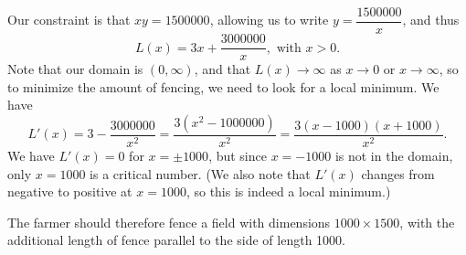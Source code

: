 \documentclass[12pt]{article}
\begin{document}
\begin{enumerate}
Our constraint is that $xy=1500000$, allowing us to write $y=\dfrac{1500000}{x}$, and thus
\[
L(x) = 3x+\frac{3000000}{x}, \text{ with } x>0.
\]
Note that our domain is $(0,\infty)$, and that $L(x)\to\infty$ as $x\to 0$ or $x\to \infty$, so to minimize the amount of fencing, we need to look for a local minimum. We have 
\[
L'(x) = 3-\frac{3000000}{x^2} =\frac{3(x^2-1000000)}{x^2}=\frac{3(x-1000)(x+1000)}{x^2}.
\]
We have $L'(x)=0$ for $x=\pm 1000$, but since $x=-1000$ is not in the domain, only $x=1000$ is a critical number. (We also note that $L'(x)$ changes from negative to positive at $x=1000$, so this is indeed a local minimum.)

The farmer should therefore fence a field with dimensions $1000\times 1500$, with the additional length of fence parallel to the side of length 1000.
\end{enumerate}




\newpage
\end{document}
